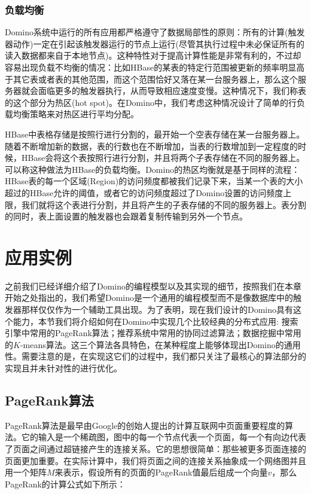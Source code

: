 \subsubsection{负载均衡}
Domino系统中运行的所有应用都严格遵守了数据局部性的原则：所有的计算(触发器动作)一定在引起该触发器运行的节点上运行(尽管其执行过程中未必保证所有的读入数据都来自于本地节点)。这种特性对于提高计算性能是非常有利的，不过却容易出现负载不均衡的情况：比如HBase的某表的特定行范围被更新的频率明显高于其它表或者表的其他范围，而这个范围恰好又落在某一台服务器上，那么这个服务器就会面临更多的触发器执行，从而导致相应速度变慢。这种情况下，我们称表的这个部分为热区(hot spot)。在Domino中，我们考虑这种情况设计了简单的行负载均衡策略来对热区进行平均分配。

HBase中表格存储是按照行进行分割的，最开始一个空表存储在某一台服务器上。随着不断增加新的数据，表的行数也在不断增加，当表的行数增加到一定程度的时候，HBase会将这个表按照行进行分割，并且将两个子表存储在不同的服务器上。可以称这种做法为HBase的负载均衡。Domino的热区均衡就是基于同样的流程：HBase表的每一个区域(Region)的访问频度都被我们记录下来，当某一个表的大小超过的HBase允许的阈值，或者它的访问频度超过了Domino设置的访问频度上限，我们就将这个表进行分割，并且将产生的子表存储的不同的服务器上。表分割的同时，表上面设置的触发器也会跟着复制传输到另外一个节点。


\section{应用实例}
\label{section:apps}
之前我们已经详细介绍了Domino的编程模型以及其实现的细节，按照我们在本章开始之处指出的，我们希望Domino是一个通用的编程模型而不是像数据库中的触发器那样仅仅作为一个辅助工具出现。为了表明，现在我们设计的Domino具有这个能力，本节我们将介绍如何在Domino中实现几个比较经典的分布式应用: 搜索引擎中常用的PageRank算法；推荐系统中常用的协同过滤算法\cite{zhou2008large}；数据挖掘中常用的$K$-means算法。这三个算法各具特色，在某种程度上能够体现出Domino的通用性。需要注意的是，在实现这它们的过程中，我们都只关注了最核心的算法部分的实现且并未针对性的进行优化。

\subsection{PageRank算法}
PageRank算法是最早由Google的创始人提出的计算互联网中页面重要程度的算法。它的输入是一个稀疏图，图中的每一个节点代表一个页面，每一个有向边代表了页面之间通过超链接产生的连接关系。它的思想很简单：那些被更多页面连接的页面更加重要。在实际计算中，我们将页面之间的连接关系抽象成一个网络图并且用一个矩阵$M$来表示，假设所有的页面的PageRank值最后组成一个向量$v$，那么PageRank的计算公式如下所示：

